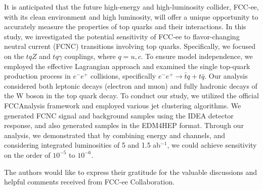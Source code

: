 \documentclass[11pt,onecolumn,english,showpacs,preprintnumbers,amsmath,amssymb,floatfix,nofootinbib]{revtex4-1}
\def\to{\rightarrow}
\begin{document}
It is anticipated that the future high-energy and high-luminosity collider, FCC-ee, with its clean environment and high luminosity, will offer a unique opportunity to accurately measure the properties of top quarks and their interactions. In this study, we investigated the potential sensitivity of FCC-ee to flavor-changing neutral current (FCNC) transitions involving top quarks.
Specifically, we focused on the $tqZ$ and $tq\gamma$ couplings, where $q=u, c$. To ensure model independence, we employed the effective Lagrangian approach and examined the single top-quark production process in $e^- e^+$ collisions, specifically $e^- e^+ \to \bar{t} q + t \bar{q}$. Our analysis considered both leptonic decays (electron and muon) and fully hadronic decays of the W boson in the top quark decay.
To conduct our study, we utilized the official FCCAnalysis framework and employed various jet clustering algorithms. We generated FCNC signal and background samples using the IDEA detector response, and also generated samples in the EDM4HEP format.
Through our analysis, we demonstrated that by combining energy and channels, and considering integrated luminosities of 5 and 1.5 ab$^{-1}$, we could achieve sensitivity on the order of $10^{-5}$ to $10^{-6}$.



%
\begin{acknowledgments}
%


The authors would like to express their gratitude for the valuable discussions 
and helpful comments received from  FCC-ee Collaboration.  


%
\end{acknowledgments}
%
	
	







%
% 
% 
%



\clearpage
\end{document}
